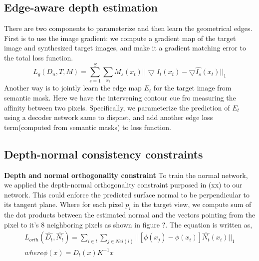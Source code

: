 \documentclass[10pt,twocolumn,letterpaper]{article}
\begin{document}
\subsection{Edge-aware depth estimation}
There are two components to parameterize and then learn the geometrical edges. First is to use the image gradient: we compute a gradient map of the target image and synthesized target images, and make it a gradient matching error to the total loss function\cite{casser2018depth}.
\begin{equation}
    L_g(D_n, T, M) = \sum_{s=1}^S\sum_{x_t}M_s(x_t)||\bigtriangledown I_t(x_t) - \bigtriangledown\hat{I_s}(x_t)||_1
\end{equation}
Another way is to jointly learn the edge map $E_t$ for the target image from semantic mask. Here we have the intervening contour cue fro measuring the affinity between two pixels. Specifically, we parameterize the prediction of $E_t$ using a decoder network same to dispnet, and add another edge loss term(computed from semantic masks) to loss function.
\subsection{Depth-normal consistency constraints}
\textbf{Depth and normal orthogonality constraint} To train the normal network, we applied the depth-normal orthogonality constraint purposed in (xx) to our network. This could enforce the predicted surface normal to be perpendicular to its tangent plane. Where for each pixel $p_i$ in the target view, we compute sum of the dot products between the estimated normal and the vectors pointing from the pixel to it's 8 neighboring pixels as shown in figure ?. The equation is written as,
\begin{multline}
    L_{orth}(\hat{D_t}, \hat{N_t}) = \sum_{i\in t}\sum_{j\in Nei(i)}||[ \phi(x_j) - \phi(x_i)] \hat{N_t}(x_i)||_1 
    \\
    where\phi(x) = D_t(x)K^{-1}x
\end{multline}
\end{document}
